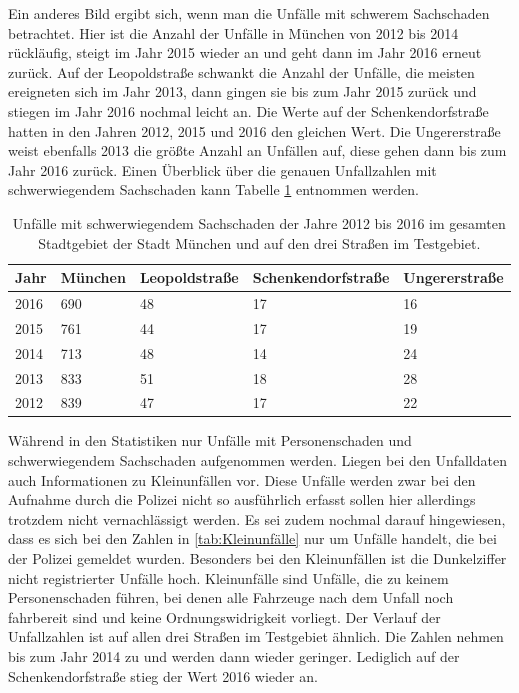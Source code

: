 Ein anderes Bild ergibt sich, wenn man die Unfälle mit schwerem Sachschaden betrachtet. Hier ist die Anzahl der Unfälle in München von 2012 bis 2014 rückläufig, steigt im Jahr 2015 wieder an und geht dann im Jahr 2016 erneut zurück. Auf der Leopoldstraße schwankt die Anzahl der Unfälle, die meisten ereigneten sich im Jahr 2013, dann gingen sie bis zum Jahr 2015 zurück und stiegen im Jahr 2016 nochmal leicht an. Die Werte auf der Schenkendorfstraße hatten in den Jahren 2012, 2015 und 2016 den gleichen Wert. Die Ungererstraße weist ebenfalls 2013 die größte Anzahl an Unfällen auf, diese gehen dann bis zum Jahr 2016 zurück. Einen Überblick über die genauen Unfallzahlen mit schwerwiegendem Sachschaden kann Tabelle \ref{tab:Unfälle München schwerw. Sachschaden} entnommen werden. 

\begin{table}[htpb]
	\scriptsize
	\caption[Unfälle mit schwerwiegendem Sachschaden]{Unfälle mit schwerwiegendem Sachschaden der Jahre 2012 bis 2016 im gesamten Stadtgebiet der Stadt München und auf den drei Straßen im Testgebiet.}\label{tab:Unfälle München schwerw. Sachschaden}
	\centering
	\begin{tabular}{l l l l p{2cm}}
		\toprule
		Jahr & München & Leopoldstraße & Schenkendorfstraße & Ungererstraße \\
		\midrule
		2016 & 690\footnotemark[1] & 48 & 17 & 16\\
		2015 & 761\footnotemark[2] & 44 & 17 & 19\\
		2014 & 713\footnotemark[3] & 48 & 14 & 24\\
		2013 & 833\footnotemark[4] & 51 & 18 & 28\\
		2012 & 839\footnotemark[5] & 47 & 17 & 22\\
		\bottomrule
	\end{tabular}
\end{table}


Während in den Statistiken nur Unfälle mit Personenschaden und schwerwiegendem Sachschaden aufgenommen werden. Liegen bei den Unfalldaten auch Informationen zu Kleinunfällen vor. Diese Unfälle werden zwar bei den Aufnahme durch die Polizei nicht so ausführlich erfasst sollen hier allerdings trotzdem nicht vernachlässigt werden. Es sei zudem nochmal darauf hingewiesen, dass es sich bei den Zahlen in \ref{tab:Kleinunfälle} nur um Unfälle handelt, die bei der Polizei gemeldet wurden. Besonders bei den Kleinunfällen ist die Dunkelziffer nicht registrierter Unfälle hoch. Kleinunfälle sind Unfälle, die zu keinem Personenschaden führen, bei denen alle Fahrzeuge nach dem Unfall noch fahrbereit sind und keine Ordnungswidrigkeit vorliegt. Der Verlauf der Unfallzahlen ist auf allen drei Straßen im Testgebiet ähnlich. Die Zahlen nehmen bis zum Jahr 2014 zu und werden dann wieder geringer. Lediglich auf der Schenkendorfstraße stieg der Wert 2016 wieder an.

